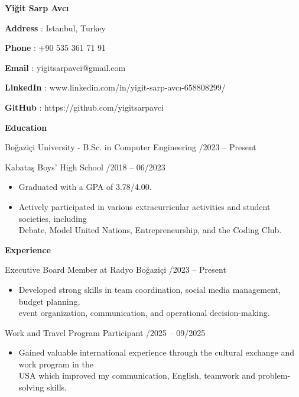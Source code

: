 \documentclass[a4paper]{article}
\newcommand{\sechead}[1]{
    \vspace{10pt}
    {\fontsize{12}{14}\bfseries #1} \par
    \vspace{4pt}
}
\newcommand{\entry}[2]{
    {\fontsize{10}{12}\fontseries{sb}\selectfont #1} \hfill {\fontsize{8}{10}\selectfont #2} \par
}
\newcommand{\desc}[1]{
    {\fontsize{8}{11}\selectfont #1}
}
\newcommand{\contactrow}[2]{
    {\fontsize{10}{14}\bfseries #1} {\fontsize{10}{14}\selectfont : #2} \par
}
\begin{document}
\begin{center}
    {\fontsize{20.5}{24}\bfseries Yi\u{g}it Sarp Avc\i{}}
\end{center}
\vspace{0.8em} %

\contactrow{Address}{Istanbul, Turkey}
\contactrow{Phone}{+90 535 361 71 91}
\contactrow{Email}{yigitsarpavci@gmail.com}
\contactrow{LinkedIn}{www.linkedin.com/in/yigit-sarp-avc\i-658808299/}
\contactrow{GitHub}{https://github.com/yigitsarpavci}

\sechead{Education}

\entry{Bo\u{g}azi\c{c}i University - B.Sc. in Computer Engineering}{09/2023 -- Present}
\vspace{2pt}

\entry{Kabata\c{s} Boys' High School}{09/2018 -- 06/2023}
\begin{itemize}[leftmargin=1.1em, itemsep=0pt, parsep=0pt, topsep=2pt]
    \item \desc{Graduated with a GPA of 3.78/4.00.}
    \item \desc{Actively participated in various extracurricular activities and student societies, including \\
    Debate, Model United Nations, Entrepreneurship, and the Coding Club.}
\end{itemize}

\sechead{Experience}

\entry{Executive Board Member at Radyo Bo\u{g}azi\c{c}i}{09/2023 -- Present}
\begin{itemize}[leftmargin=1.1em, itemsep=0pt, parsep=0pt, topsep=2pt]
   \item \desc{Developed strong skills in team coordination, social media management, budget planning,\\ event organization, communication, and operational decision-making.}
\end{itemize}
\vspace{2pt}

\entry{Work and Travel Program Participant}{06/2025 -- 09/2025}
\begin{itemize}[leftmargin=1.1em, itemsep=0pt, parsep=0pt, topsep=2pt]
   \item \desc{Gained valuable international experience through the cultural exchange and work program in the\\ USA which improved my communication, English, teamwork and problem-solving skills.}
\end{itemize}
\vspace{2pt}
\end{document}
